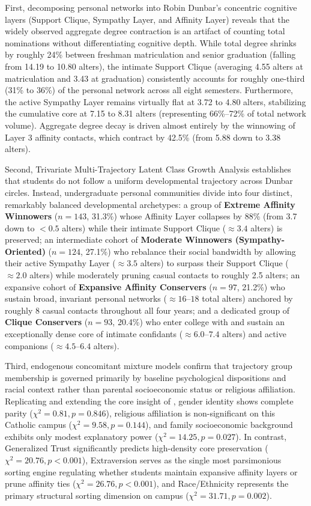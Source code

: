 \documentclass[12pt]{article}
\begin{document}
First, decomposing personal networks into Robin Dunbar's concentric cognitive layers (Support Clique, Sympathy Layer, and Affinity Layer) reveals that the widely observed aggregate degree contraction is an artifact of counting total nominations without differentiating cognitive depth. While total degree shrinks by roughly 24\% between freshman matriculation and senior graduation (falling from 14.19 to 10.80 alters), the intimate Support Clique (averaging 4.55 alters at matriculation and 3.43 at graduation) consistently accounts for roughly one-third (31\% to 36\%) of the personal network across all eight semesters. Furthermore, the active Sympathy Layer remains virtually flat at 3.72 to 4.80 alters, stabilizing the cumulative core at 7.15 to 8.31 alters (representing 66\%--72\% of total network volume). Aggregate degree decay is driven almost entirely by the winnowing of Layer 3 affinity contacts, which contract by 42.5\% (from 5.88 down to 3.38 alters).

Second, Trivariate Multi-Trajectory Latent Class Growth Analysis establishes that students do not follow a uniform developmental trajectory across Dunbar circles. Instead, undergraduate personal communities divide into four distinct, remarkably balanced developmental archetypes: a group of \textbf{Extreme Affinity Winnowers} ($n = 143$, 31.3\%) whose Affinity Layer collapses by 88\% (from 3.7 down to $<0.5$ alters) while their intimate Support Clique ($\approx 3.4$ alters) is preserved; an intermediate cohort of \textbf{Moderate Winnowers (Sympathy-Oriented)} ($n = 124$, 27.1\%) who rebalance their social bandwidth by allowing their active Sympathy Layer ($\approx 3.5$ alters) to surpass their Support Clique ($\approx 2.0$ alters) while moderately pruning casual contacts to roughly 2.5 alters; an expansive cohort of \textbf{Expansive Affinity Conservers} ($n = 97$, 21.2\%) who sustain broad, invariant personal networks ($\approx 16\text{--}18$ total alters) anchored by roughly 8 casual contacts throughout all four years; and a dedicated group of \textbf{Clique Conservers} ($n = 93$, 20.4\%) who enter college with and sustain an exceptionally dense core of intimate confidants ($\approx 6.0\text{--}7.4$ alters) and active companions ($\approx 4.5\text{--}6.4$ alters).

Third, endogenous concomitant mixture models confirm that trajectory group membership is governed primarily by baseline psychological dispositions and racial context rather than parental socioeconomic status or religious affiliation. Replicating and extending the core insight of \citet{chandler2018classifying}, gender identity shows complete parity ($\chi^2 = 0.81, p = 0.846$), religious affiliation is non-significant on this Catholic campus ($\chi^2 = 9.58, p = 0.144$), and family socioeconomic background exhibits only modest explanatory power ($\chi^2 = 14.25, p = 0.027$). In contrast, Generalized Trust significantly predicts high-density core preservation ($\chi^2 = 20.76, p < 0.001$), Extraversion serves as the single most parsimonious sorting engine regulating whether students maintain expansive affinity layers or prune affinity ties ($\chi^2 = 26.76, p < 0.001$), and Race/Ethnicity represents the primary structural sorting dimension on campus ($\chi^2 = 31.71, p = 0.002$).
\end{document}
